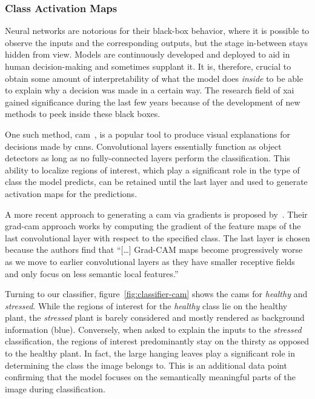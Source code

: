 \documentclass[draft,final]{vutinfth} %
\begin{document}
\subsubsection{Class Activation Maps}
\label{sssec:classifier-cam}

Neural networks are notorious for their black-box behavior, where it
is possible to observe the inputs and the corresponding outputs, but
the stage in-between stays hidden from view. Models are continuously
developed and deployed to aid in human decision-making and sometimes
supplant it. It is, therefore, crucial to obtain some amount of
interpretability of what the model does \emph{inside} to be able to
explain why a decision was made in a certain way. The research field
of \gls{xai} gained significance during the last few years because of
the development of new methods to peek inside these black boxes.

One such method, \gls{cam}~\cite{zhou2015}, is a popular tool to
produce visual explanations for decisions made by
\glspl{cnn}. Convolutional layers essentially function as object
detectors as long as no fully-connected layers perform the
classification. This ability to localize regions of interest, which
play a significant role in the type of class the model predicts, can
be retained until the last layer and used to generate activation maps
for the predictions.

A more recent approach to generating a \gls{cam} via gradients is
proposed by~\textcite{selvaraju2020}. Their \gls{grad-cam} approach
works by computing the gradient of the feature maps of the last
convolutional layer with respect to the specified class. The last
layer is chosen because the authors find that ``[…]  Grad-CAM maps
become progressively worse as we move to earlier convolutional layers
as they have smaller receptive fields and only focus on less semantic
local features.''~\cite[p.5]{selvaraju2020}

Turning to our classifier, figure~\ref{fig:classifier-cam} shows the
\glspl{cam} for \emph{healthy} and \emph{stressed}. While the regions
of interest for the \emph{healthy} class lie on the healthy plant, the
\emph{stressed} plant is barely considered and mostly rendered as
background information (blue). Conversely, when asked to explain the
inputs to the \emph{stressed} classification, the regions of interest
predominantly stay on the thirsty as opposed to the healthy plant. In
fact, the large hanging leaves play a significant role in determining
the class the image belongs to. This is an additional data point
confirming that the model focuses on the semantically meaningful parts
of the image during classification.
\end{document}
